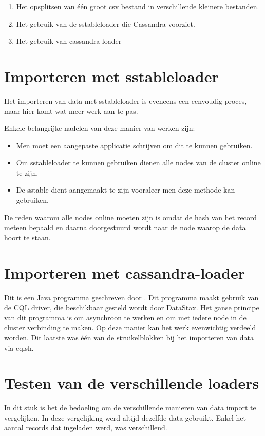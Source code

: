 \begin{enumerate}
	\item Het opsplitsen van één groot csv bestand in verschillende kleinere bestanden.
	\item Het gebruik van de sstableloader die Cassandra voorziet.
	\item Het gebruik van cassandra-loader
\end{enumerate}

\section{Importeren met sstableloader}

Het importeren van data met sstableloader is eveneens een eenvoudig proces, maar hier komt wat meer werk aan te pas.

Enkele belangrijke nadelen van deze manier van werken zijn:
\begin{itemize}
	\item Men moet een aangepaste applicatie schrijven om dit te kunnen gebruiken.
	\item Om sstableloader te kunnen gebruiken dienen alle nodes van de cluster online te zijn.
	\item De sstable dient aangemaakt te zijn vooraleer men deze methode kan gebruiken.
\end{itemize}

De reden waarom alle nodes online moeten zijn is omdat de hash van het record meteen bepaald en daarna doorgestuurd wordt naar de node waarop de data hoort te staan.

\section{Importeren met cassandra-loader}
Dit is een Java programma geschreven door \cite{Hess2016loader}.
Dit programma maakt gebruik van de CQL driver, die beschikbaar gesteld wordt door DataStax.
Het ganse principe van dit programma is om asynchroon te werken en om met iedere node in de cluster verbinding te maken.
Op deze manier kan het werk evenwichtig verdeeld worden.
Dit laatste was één van de struikelblokken bij het importeren van data via cqlsh.

\section{Testen van de verschillende loaders}
In dit stuk is het de bedoeling om de verschillende manieren van data import te vergelijken.
In deze vergelijking werd altijd dezelfde data gebruikt.
Enkel het aantal records dat ingeladen werd, was verschillend.

